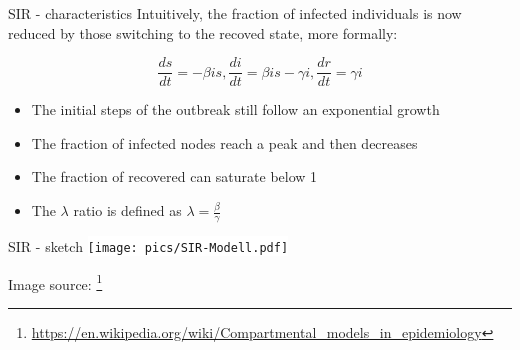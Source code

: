 \begin{textbox}{SIR - characteristics}
    Intuitively, the fraction of infected individuals is now reduced by those switching to the recoved state, more formally:

    \[
        \frac{ds}{dt}=-\beta i s ,
        \frac{di}{dt}=\beta i s- \gamma i,
        \frac{dr}{dt}= \gamma i
    \]

    \begin{itemize}
        \item The initial steps of the outbreak still follow an exponential growth
        \item The fraction of infected nodes reach a peak and then decreases
        \item The fraction of recovered can saturate below 1
        \item The $\lambda$ ratio is defined as $\lambda=\frac{\beta}{\gamma}$
    \end{itemize}


\end{textbox}


\begin{textbox}{SIR - sketch}
    \centering
    \colorbox{white}{\texttt{[image: pics/SIR-Modell.pdf]}}

    Image source: \footnote{\url{https://en.wikipedia.org/wiki/Compartmental_models_in_epidemiology}}
\end{textbox}




